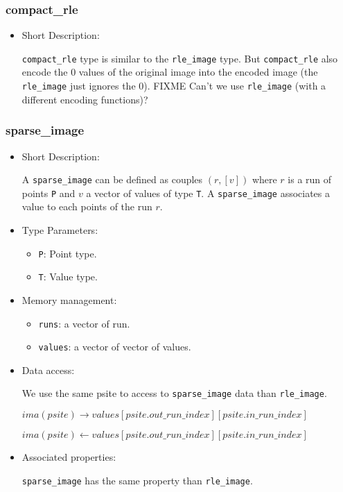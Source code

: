 \subsubsection{compact\_rle}
\begin{itemize}
\item{Short Description:}

\verb+compact_rle+ type is similar to the \verb+rle_image+ type.
But \verb+compact_rle+ also encode the 0 values of the original image into
the encoded image (the \verb+rle_image+ just ignores the 0).
FIXME Can't we use \verb+rle_image+ (with a different encoding functions)?

\end{itemize}


\subsubsection{sparse\_image}
\begin{itemize}
\item{Short Description:}

A \verb+sparse_image+ can be defined as couples $(r, [v])$ where $r$ is a run 
of points \verb+P+ and $v$ a vector of values of type \verb+T+.
A \verb+sparse_image+ associates a value to each points of the run $r$.

\item{Type Parameters:}

\begin{itemize}
\item \verb+P+: Point type.
\item \verb+T+: Value type.
\end{itemize}


\item{Memory management:}
\begin{itemize}
\item \verb+runs+: a vector of run.
\item \verb+values+: a vector of vector of values.
\end{itemize}

\item{Data access:}

We use the same psite to access to \verb+sparse_image+ data than
\verb+rle_image+.

$ima(psite) \rightarrow values[psite.out\_run\_index][psite.in\_run\_index]$

$ima(psite) \leftarrow values[psite.out\_run\_index][psite.in\_run\_index]$


\item{Associated properties:}

\verb+sparse_image+ has the same property than \verb+rle_image+.

\end{itemize}


